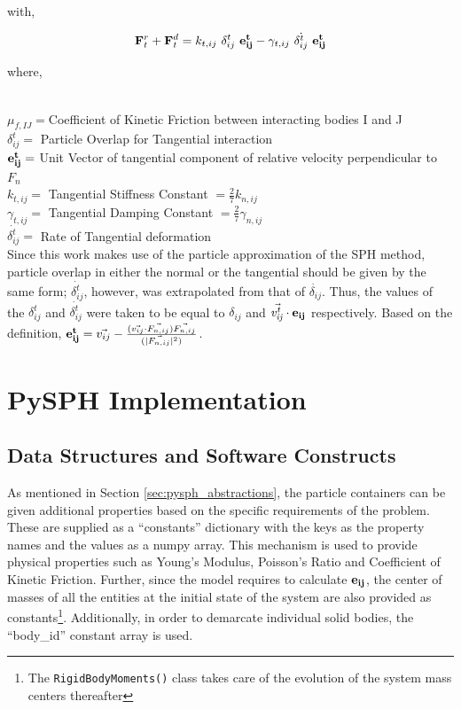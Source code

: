\hspace{3.15cm}with,

\begin{eqnarray}
 {\bf{F}}_t^r + {\bf{F}}_t^d = k_{t,ij}~\delta^t_{ij}~{\bf{e^t_{ij}}} - \gamma _{t,ij} ~ \dot{\delta ^t_{ij}}~\bf{e^t_{ij}}
\end{eqnarray}

{\raggedright{where,}}\\
$\mu_{f,IJ} = $Coefficient of Kinetic Friction between interacting bodies I and J\\
$\delta^t_{ij} = $ Particle Overlap for Tangential interaction \\
${\bf{e^t_{ij}}} = $ Unit Vector of tangential component of relative velocity perpendicular to $F_n$\cite{vetsch}\\
$k_{t,ij} = $ Tangential Stiffness Constant $= \frac{2}{7} k_{n,ij}$ \cite{hooman}\\
$\gamma_{t,ij} = $ Tangential Damping Constant $=\frac{2}{7} \gamma_{n,ij}$\cite{canelas_thesis}\\
$\dot{\delta ^t_{ij}} = $ Rate of Tangential deformation \\

Since this work makes use of the particle approximation of the SPH method, particle overlap in either the normal or the tangential should be given by the same form; $\dot{\delta ^t_{ij}}$, however, was extrapolated from that of $\dot{\delta _{ij}}$. Thus, the values of the  $\delta^t_{ij}$ and $\dot{\delta ^t_{ij}}$ were taken to be equal to $\delta_{ij}$ and $ \vec{\it{v^t_{ij}}}\cdot {\bf{e_{ij}}}$ respectively. Based on the definition, ${\bf{e^t_{ij}}} = \vec{v_{ij}} - \frac{(\vec{v_{ij}} \cdot \vec{F_{n,ij}}) \vec{F_{n,ij}}}{(|\vec{F_{n,ij}}|^2)}$.

\section{PySPH Implementation}

\subsection{Data Structures and Software Constructs}
As mentioned in Section \ref{sec:pysph_abstractions}, the particle containers can be given additional properties based on the specific requirements of the problem. These are supplied as a ``constants'' dictionary with the keys as the property names and the values as a numpy array. This mechanism is used to provide physical properties such as Young's Modulus, Poisson's Ratio and Coefficient of Kinetic Friction. Further, since the model requires to calculate ${\bf{e_{ij}}}$, the center of masses of all the entities at the initial state of the system are also provided as constants\footnote[9]{The \lstinline!RigidBodyMoments()! class takes care of the evolution of the system mass centers thereafter}. Additionally, in order to demarcate individual solid bodies, the ``body\_id'' constant array is used. 

